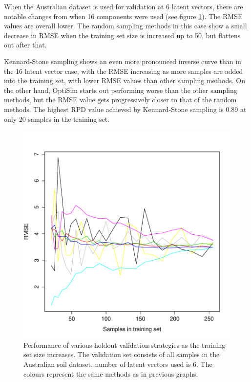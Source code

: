 \documentclass{isprs}
\begin{document}
When the Australian dataset is used for validation at 6 latent vectors, there are notable changes from when 16 components were used (see figure \ref{fig:rmse-au-6}). The RMSE values are overall lower. The random sampling methods in this case show a small decrease in RMSE when the training set size is increased up to 50, but flattens out after that.

Kennard-Stone sampling shows an even more pronounced inverse curve than in the 16 latent vector case, with the RMSE increasing as more samples are added into the training set, with lower RMSE values than other sampling methods. On the other hand, OptiSim starts out performing worse than the other sampling methods, but the RMSE value gets progressively closer to that of the random methods. The highest RPD value achieved by Kennard-Stone sampling is 0.89 at only 20 samples in the training set.

\begin{figure}[ht!]
\includegraphics[width=1.0\columnwidth]{../script/output/rmse-au-6.pdf}
\begin{center}
    \caption{Performance of various holdout validation strategies as the training set size increases. The validation set consists of all samples in the Australian soil dataset, number of latent vectors used is 6. The colours represent the same methods as in previous graphs.}
    \label{fig:rmse-au-6}
\end{center}
\end{figure}
\end{document}
